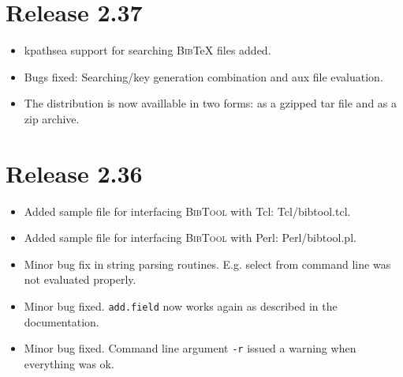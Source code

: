 \documentclass[11pt,a4paper]{scrartcl}
\newcommand\Arg[1]{\texttt{#1}}
\newcommand\rsc[1]{\texttt{#1}}
\newcommand\File[1]{\textsf{#1}}
\newcommand\BibTool{\textsc{BibTool}}
\newcommand\BibTeX{\textsc{Bib}\TeX}
\newenvironment{Release}[2]{%
  \def\tmp{#2}%
  \section*{Release #1 \ifx\tmp\empty\else{\normalsize[#2]}\fi}
  \begin{itemize}
}{\end{itemize}}
\newenvironment{Fix}[1]{\item }{}
\newenvironment{New}[1]{\item }{}
\begin{document}
\begin{multicols}
 \begin{Release}{2.37}{}
  \begin{New}{gene}
    kpathsea support for searching \BibTeX{} files added.
  \end{New}
  \begin{Fix}{gene}
    Bugs fixed: Searching/key generation combination and aux file evaluation.
  \end{Fix}
  \begin{New}{gene}
    The distribution is now availlable in two forms: as a gzipped tar file and
    as a zip archive.
  \end{New}
 \end{Release}

 \begin{Release}{2.36}{}
  \begin{New}{gene}
    Added sample file for interfacing \BibTool{} with Tcl:
    \File{Tcl/bibtool.tcl}.
  \end{New}
  \begin{New}{gene}
    Added sample file for interfacing \BibTool{} with Perl:
    \File{Perl/bibtool.pl}.
  \end{New}
  \begin{Fix}{gene}
    Minor bug fix in string parsing routines. E.g. select from command line
    was not evaluated properly.
  \end{Fix}
  \begin{Fix}{gene}
    Minor bug fixed. \rsc{add.field} now works again as described in
    the documentation.
  \end{Fix}
  \begin{Fix}{gene}
    Minor bug fixed. Command line argument \Arg{-r} issued a warning
    when everything was ok.
  \end{Fix}
 \end{Release}


\end{multicols}
\end{document}
